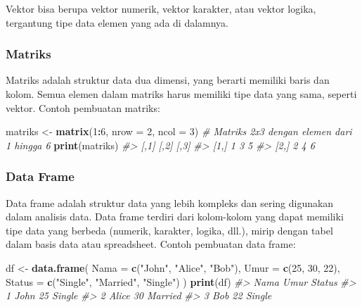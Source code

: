 \documentclass[
  oneside]{book}
\newenvironment{Shaded}{\begin{snugshade}}{\end{snugshade}}
\newcommand{\AttributeTok}[1]{\textcolor[rgb]{0.13,0.29,0.53}{#1}}
\newcommand{\CommentTok}[1]{\textcolor[rgb]{0.56,0.35,0.01}{\textit{#1}}}
\newcommand{\DecValTok}[1]{\textcolor[rgb]{0.00,0.00,0.81}{#1}}
\newcommand{\FunctionTok}[1]{\textcolor[rgb]{0.13,0.29,0.53}{\textbf{#1}}}
\newcommand{\NormalTok}[1]{#1}
\newcommand{\OtherTok}[1]{\textcolor[rgb]{0.56,0.35,0.01}{#1}}
\newcommand{\SpecialCharTok}[1]{\textcolor[rgb]{0.81,0.36,0.00}{\textbf{#1}}}
\newcommand{\StringTok}[1]{\textcolor[rgb]{0.31,0.60,0.02}{#1}}
\begin{document}
Vektor bisa berupa vektor numerik, vektor karakter, atau vektor logika,
tergantung tipe data elemen yang ada di dalamnya.

\subsubsection*{Matriks}\label{matriks}

Matriks adalah struktur data dua dimensi, yang berarti memiliki baris
dan kolom. Semua elemen dalam matriks harus memiliki tipe data yang
sama, seperti vektor. Contoh pembuatan matriks:

\begin{Shaded}
\begin{Highlighting}[]
\NormalTok{matriks }\OtherTok{\textless{}{-}} \FunctionTok{matrix}\NormalTok{(}\DecValTok{1}\SpecialCharTok{:}\DecValTok{6}\NormalTok{, }\AttributeTok{nrow =} \DecValTok{2}\NormalTok{, }\AttributeTok{ncol =} \DecValTok{3}\NormalTok{)  }\CommentTok{\# Matriks 2x3 dengan elemen dari 1 hingga 6}
\FunctionTok{print}\NormalTok{(matriks)}
\CommentTok{\#\textgreater{}      [,1] [,2] [,3]}
\CommentTok{\#\textgreater{} [1,]    1    3    5}
\CommentTok{\#\textgreater{} [2,]    2    4    6}
\end{Highlighting}
\end{Shaded}

\subsubsection*{Data Frame}\label{data-frame}

Data frame adalah struktur data yang lebih kompleks dan sering digunakan
dalam analisis data. Data frame terdiri dari kolom-kolom yang dapat
memiliki tipe data yang berbeda (numerik, karakter, logika, dll.), mirip
dengan tabel dalam basis data atau spreadsheet. Contoh pembuatan data
frame:

\begin{Shaded}
\begin{Highlighting}[]
\NormalTok{df }\OtherTok{\textless{}{-}} \FunctionTok{data.frame}\NormalTok{(}
  \AttributeTok{Nama =} \FunctionTok{c}\NormalTok{(}\StringTok{"John"}\NormalTok{, }\StringTok{"Alice"}\NormalTok{, }\StringTok{"Bob"}\NormalTok{),}
  \AttributeTok{Umur =} \FunctionTok{c}\NormalTok{(}\DecValTok{25}\NormalTok{, }\DecValTok{30}\NormalTok{, }\DecValTok{22}\NormalTok{),}
  \AttributeTok{Status =} \FunctionTok{c}\NormalTok{(}\StringTok{"Single"}\NormalTok{, }\StringTok{"Married"}\NormalTok{, }\StringTok{"Single"}\NormalTok{)}
\NormalTok{)}
\FunctionTok{print}\NormalTok{(df)}
\CommentTok{\#\textgreater{}    Nama Umur  Status}
\CommentTok{\#\textgreater{} 1  John   25  Single}
\CommentTok{\#\textgreater{} 2 Alice   30 Married}
\CommentTok{\#\textgreater{} 3   Bob   22  Single}
\end{Highlighting}
\end{Shaded}
\end{document}
